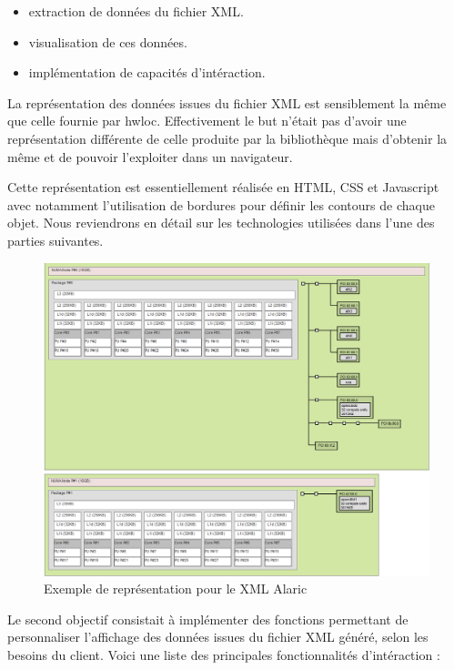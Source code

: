 \documentclass [a4paper,11pt]{article}
\begin{document}
\begin{itemize}
\item extraction de données du fichier XML.
\item visualisation de ces données.
\item implémentation de capacités d'intéraction.
\end{itemize}

La représentation des données issues du fichier XML est sensiblement la même que celle fournie par hwloc. Effectivement le but n'était pas d'avoir une représentation différente de celle produite par la bibliothèque mais d'obtenir la même et de pouvoir l'exploiter dans un navigateur. 
\newline

Cette représentation est essentiellement réalisée en HTML, CSS et Javascript avec notamment l'utilisation de bordures pour définir les contours de chaque objet. Nous reviendrons en détail sur les technologies utilisées dans l'une des parties suivantes.

\begin{figure}[!h]
\centering
\includegraphics[scale=0.5]{img/alaric.png}
\caption[Résultats]{Exemple de représentation pour le XML Alaric}
\end{figure}

Le second objectif consistait à implémenter des fonctions permettant de personnaliser l'affichage des données issues du fichier XML généré, selon les besoins du client. Voici une liste des principales fonctionnalités d'intéraction : \newline
\end{document}
